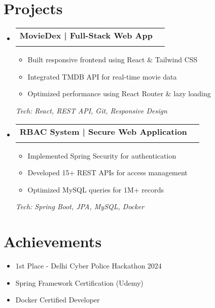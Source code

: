 \documentclass[a4paper,11pt]{article}
\makeatletter
\newcommand{\resumeItem}[1]{\item #1}
\newcommand{\resumeSubheading}[4]{
  \vspace{-1pt}\item
    \begin{tabular*}{0.97\textwidth}{l@{\extracolsep{\fill}}r}
      \textbf{#1} & \textit{\small #4} \\
      \textnormal{\small#2} & \textit{\small #3} \\
    \end{tabular*}\vspace{-2pt}
}
\newcommand{\resumeSubItem}[1]{\resumeItem{\small{#1}}}
\newcommand{\resumeSubHeadingListStart}{\begin{itemize}[leftmargin=0.15in, label={}, itemsep=1pt]}
\newcommand{\resumeSubHeadingListEnd}{\end{itemize}}
\newcommand{\resumeItemListStart}{\begin{itemize}[leftmargin=0.2in, itemsep=0pt, parsep=0pt]}
\newcommand{\resumeItemListEnd}{\end{itemize}\vspace{-5pt}}
\makeatother
\begin{document}
\section{Projects}
\vspace{1mm}
\resumeSubHeadingListStart
    \resumeSubheading{MovieDex | Full-Stack Web App}{}{}{}
    \resumeItemListStart
        \resumeSubItem{Built responsive frontend using React \& Tailwind CSS}
        \resumeSubItem{Integrated TMDB API for real-time movie data}
        \resumeSubItem{Optimized performance using React Router \& lazy loading}
    \resumeItemListEnd
    {\small\textit{Tech: React, REST API, Git, Responsive Design}}
    \vspace{3mm}
    
    \resumeSubheading{RBAC System | Secure Web Application}{}{}{}
    \resumeItemListStart
        \resumeSubItem{Implemented Spring Security for authentication}
        \resumeSubItem{Developed 15+ REST APIs for access management}
        \resumeSubItem{Optimized MySQL queries for 1M+ records}
    \resumeItemListEnd
    {\small\textit{Tech: Spring Boot, JPA, MySQL, Docker}}
\resumeSubHeadingListEnd

\section{Achievements}
\resumeItemListStart
    \resumeItem{1st Place - Delhi Cyber Police Hackathon 2024}
    \resumeItem{Spring Framework Certification (Udemy)}
    \resumeItem{Docker Certified Developer}
\resumeItemListEnd
\end{document}
